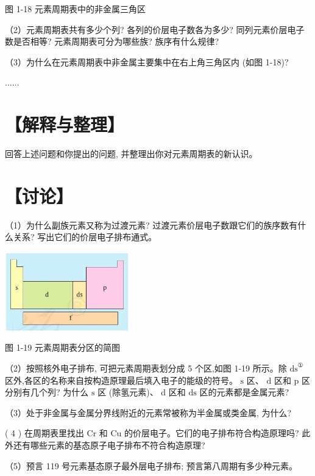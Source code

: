 \documentclass[10pt]{article}
\begin{document}
图 1-18 元素周期表中的非金属三角区

（2）元素周期表共有多少个列? 各列的价层电子数各为多少? 同列元素价层电子数是否相等? 元素周期表可分为哪些族? 族序有什么规律?

（3）为什么在元素周期表中非金属主要集中在右上角三角区内 (如图 1-18)?

\(\ldots \ldots\)

\section*{【解释与整理】}

回答上述问题和你提出的问题, 并整理出你对元素周期表的新认识。

\section*{【讨论】}

（1）为什么副族元素又称为过渡元素? 过渡元素价层电子数跟它们的族序数有什么关系? 写出它们的价层电子排布通式。

\begin{center}
\includegraphics[max width=0.4\textwidth]{images/0190e026-5a11-7df7-bd27-54d09026ba7a_24_958653.jpg}
\end{center}

图 1-19 元素周期表分区的简图

（2）按照核外电子排布, 可把元素周期表划分成 5 个区,如图 1-19 所示。除 \({\mathrm{{ds}}}^{\text{①}}\) 区外,各区的名称来自按构造原理最后填入电子的能级的符号。 \(\mathrm{s}\) 区、 \(\mathrm{d}\) 区和 \(\mathrm{p}\) 区分别有几个列? 为什么 \(\mathrm{s}\) 区 (除氢元素)、 \(\mathrm{d}\) 区和 \(\mathrm{{ds}}\) 区的元素都是金属元素?

（3）处于非金属与金属分界线附近的元素常被称为半金属或类金属, 为什么?

( 4 ) 在周期表里找出 \(\mathrm{{Cr}}\) 和 \(\mathrm{{Cu}}\) 的价层电子。它们的电子排布符合构造原理吗? 此外还有哪些元素的基态原子电子排布不符合构造原理?

（5）预言 119 号元素基态原子最外层电子排布; 预言第八周期有多少种元素。

\end{document}
